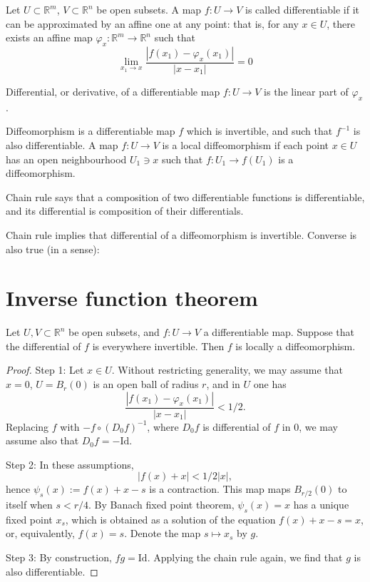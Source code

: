 \begin{definition}
\label{definition-differentiable-map}
Let $U \subset \mathbb{R}^m$, $V \subset
\mathbb{R}^n$ be open subsets. A map
$f:U \to V$ is called differentiable if it
can be approximated by an affine one at any
point: that is, for any $x \in U$, there
exists an affine map $\varphi_x:\mathbb{R}^m
\to \mathbb{R}^n$ such that
$$
\lim_{x_1 \to x}
\frac{|f(x_1)-\varphi_x(x_1)|}{|x-x_1|}=0
$$
\end{definition}

\begin{definition}
\label{definition-differential}
Differential, or derivative, of a
differentiable map $f:U \to V$ is the linear
part of $\varphi_x$.
\end{definition}

\begin{definition}
\label{definition-diffeomorphism}
Diffeomorphism is a differentiable map $f$
which is invertible, and such that $f^{-1}$
is also differentiable. A map
$f:U \to V$ is a local diffeomorphism if each
point $x \in U$ has an open neighbourhood
$U_1 \ni x$ such that
$f:U_1 \to f(U_1)$ is a diffeomorphism.
\end{definition}

\medskip\noindent
Chain rule says that a composition of two
differentiable functions is differentiable,
and its differential is composition of their
differentials.

\medskip\noindent
Chain rule implies that differential of a
diffeomorphism is invertible. Converse is
also true (in a sense):

\section{Inverse function theorem}
\label{section-inverse-function-theorem}

\begin{theorem}
\label{theorem-inverse-function}
Let $U, V \subset \mathbb{R}^n$ be open
subsets, and $f:U \to V$ a differentiable
map. Suppose that the differential of $f$ is
everywhere invertible. Then $f$ is locally a
diffeomorphism.
\end{theorem}

\begin{proof}
Step 1: Let $x \in U$. Without restricting
generality, we may assume that $x=0$,
$U=B_r(0)$ is an open ball of radius $r$,
and in $U$ one has
$$
\frac{|f(x_1)-\varphi_x(x_1)|}{|x-x_1|}<1/2.
$$
Replacing $f$ with $-f \circ (D_0f)^{-1}$,
where $D_0f$ is differential of $f$ in $0$,
we may assume also that $D_0f=-\mathrm{Id}$.

Step 2: In these assumptions,
$$
|f(x)+x|<1/2|x|,
$$
hence $\psi_s(x) := f(x)+x-s$ is a
contraction. This map maps $B_{r/2}(0)$ to
itself when $s < r/4$. By Banach fixed point
theorem, $\psi_s(x)=x$ has a unique fixed
point $x_s$, which is obtained as a solution
of the equation $f(x)+x-s=x$, or,
equivalently, $f(x)=s$. Denote the map
$s \mapsto x_s$ by $g$.

Step 3: By construction, $fg=\mathrm{Id}$. Applying
the chain rule again, we find that $g$ is
also differentiable.
\end{proof}

